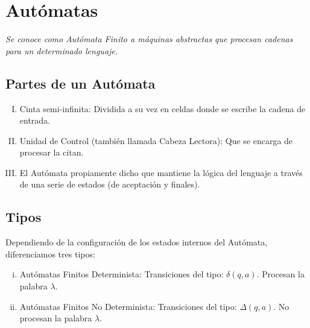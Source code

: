 \documentclass{beamer}
\theoremstyle{definition}
\theoremstyle{remark}
\begin{document}
\section{Autómatas}

\begin{frame}
\textit{Se conoce como Autómata Finito a máquinas abstractas que procesan cadenas para un determinado lenguaje.}



\end{frame}

\subsection{Partes de un Autómata}

\begin{frame}

\begin{enumerate}[I.]

\item Cinta semi-infinita: Dividida a su vez en celdas donde se escribe la cadena de entrada.

\item {}Unidad de Control (también llamada Cabeza Lectora): Que se encarga de procesar la citan.

\item El Autómata propiamente dicho que mantiene la lógica del lenguaje a través de una serie de estados (de aceptación y finales).

\end{enumerate}
\end{frame}

\subsection{Tipos}

\begin{frame}
Dependiendo de la configuración de los estados internos del Autómata, diferenciamos tres tipos:

\begin{enumerate}[i.]

\item Autómatas Finitos Determinista: Transiciones del tipo: $\delta (q, a)$. Procesan la palabra $\lambda$.

\item Autómatas Finitos No Determinista: Transiciones del tipo: $\Delta (q, a)$. No procesan la palabra $\lambda$.

\end{enumerate}

\end{frame}
\end{document}
